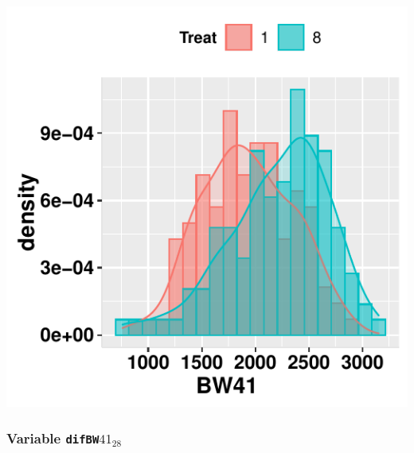 \documentclass[11pt,a4paper]{article}\usepackage[]{graphicx}\usepackage[]{color}
\makeatletter
\def\maxwidth{ %
  \ifdim\Gin@nat@width>\linewidth
    \linewidth
  \else
    \Gin@nat@width
  \fi
}
\newenvironment{knitrout}{}{} %
\makeatother
\begin{document}
\begin{knitrout}
\color{fgcolor}
\includegraphics[width=\maxwidth]{figure/unnamed-chunk-12-1} 

\end{knitrout}


\clearpage
\subsubsection{Variable \texttt{difBW$41_{28}$}}
\end{document}
